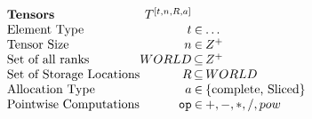 \begin{figure}[t]
  \small
\begin{subfigure}{\columnwidth}
\(
\begin{array}{@{}l@{}r@{\,}c@{\,}l@{}}
        \textbf{Tensors} & \tensor{}^{[\type{},n,\Locs{}, \alloc{}]}\\
        \text{Element Type} & \type{} & \in & \ldots\\ %
        \text{Tensor Size} & n & \in & Z^{+} \\
        \text{Set of all ranks} & WORLD & \subseteq & Z^{+} \\
        \text{Set of Storage Locations} & \Locs{} & \subseteq & WORLD\\
        \text{Allocation Type} & \alloc{} & \in & \{\text{\complete, Sliced}\}\\
        \text{Pointwise Computations} & \texttt{op} & \in &{+, -, *, /, pow}\\
\end{array}
\)
\end{subfigure}


\end{figure}
